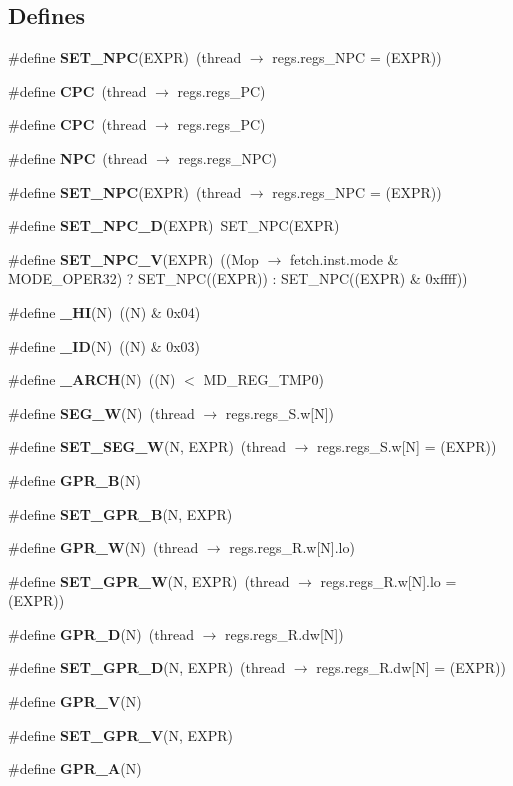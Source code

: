 \subsection*{Defines}
\begin{CompactItemize}
\item 
\#define {\bf SET\_\-NPC}(EXPR)~(thread $\rightarrow$ regs.regs\_\-NPC = (EXPR))
\item 
\#define {\bf CPC}~(thread $\rightarrow$ regs.regs\_\-PC)
\item 
\#define {\bf CPC}~(thread $\rightarrow$ regs.regs\_\-PC)
\item 
\#define {\bf NPC}~(thread $\rightarrow$ regs.regs\_\-NPC)
\item 
\#define {\bf SET\_\-NPC}(EXPR)~(thread $\rightarrow$ regs.regs\_\-NPC = (EXPR))
\item 
\#define {\bf SET\_\-NPC\_\-D}(EXPR)~SET\_\-NPC(EXPR)
\item 
\#define {\bf SET\_\-NPC\_\-V}(EXPR)~((Mop $\rightarrow$ fetch.inst.mode \& MODE\_\-OPER32) ? SET\_\-NPC((EXPR)) : SET\_\-NPC((EXPR) \& 0xffff))
\item 
\#define {\bf \_\-HI}(N)~((N) \& 0x04)
\item 
\#define {\bf \_\-ID}(N)~((N) \& 0x03)
\item 
\#define {\bf \_\-ARCH}(N)~((N) $<$ MD\_\-REG\_\-TMP0)
\item 
\#define {\bf SEG\_\-W}(N)~(thread $\rightarrow$ regs.regs\_\-S.w[N])
\item 
\#define {\bf SET\_\-SEG\_\-W}(N, EXPR)~(thread $\rightarrow$ regs.regs\_\-S.w[N] = (EXPR))
\item 
\#define {\bf GPR\_\-B}(N)
\item 
\#define {\bf SET\_\-GPR\_\-B}(N, EXPR)
\item 
\#define {\bf GPR\_\-W}(N)~(thread $\rightarrow$ regs.regs\_\-R.w[N].lo)
\item 
\#define {\bf SET\_\-GPR\_\-W}(N, EXPR)~(thread $\rightarrow$ regs.regs\_\-R.w[N].lo = (EXPR))
\item 
\#define {\bf GPR\_\-D}(N)~(thread $\rightarrow$ regs.regs\_\-R.dw[N])
\item 
\#define {\bf SET\_\-GPR\_\-D}(N, EXPR)~(thread $\rightarrow$ regs.regs\_\-R.dw[N] = (EXPR))
\item 
\#define {\bf GPR\_\-V}(N)
\item 
\#define {\bf SET\_\-GPR\_\-V}(N, EXPR)
\item 
\#define {\bf GPR\_\-A}(N)
\item 

\end{CompactItemize}
